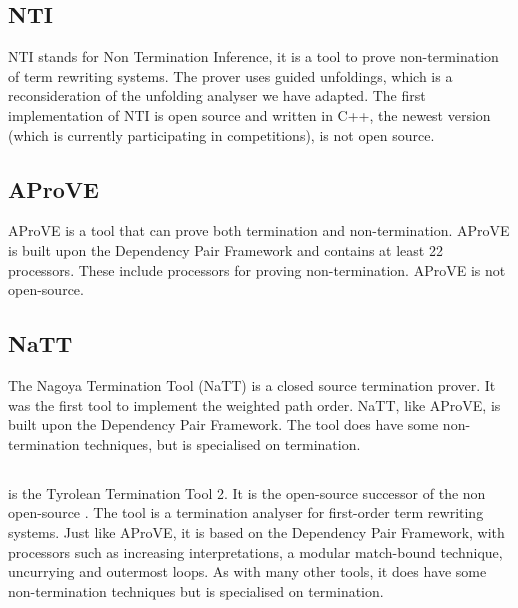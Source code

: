 \subsection*{NTI}
NTI\cite{payet2018guided} stands for Non Termination Inference, it is a tool to prove non-termination of term rewriting systems. The prover uses guided unfoldings, which is a reconsideration of the unfolding analyser we have adapted\cite{Payet:Unfolding}. The first implementation of NTI is open source and written in C++, the newest version (which is currently participating in competitions), is not open source\cite{PAYET:NTI}.

\subsection*{AProVE}
AProVE\cite{10.1007/11814771_24} is a tool that can prove both termination and non-termination. AProVE is built upon the Dependency Pair Framework and contains at least 22 processors. These include processors for proving non-termination\cite{GIESL:APROVE}. AProVE is not open-source. 

\subsection*{NaTT}
The Nagoya Termination Tool (NaTT) is a closed source termination prover\cite{Yamada2014NagoyaTT}. It was the first tool to implement the weighted path order\cite{Yamada2014NagoyaTT}. NaTT, like AProVE, is built upon the Dependency Pair Framework. The tool does have some non-termination techniques, but is specialised on termination.

\subsection*{\TTTT}
\TTTT is the Tyrolean Termination Tool 2\cite{TTTT}. It is the open-source successor of the non open-source \TTT \cite{HIROKAWA2007474}. The tool is a termination analyser for first-order term rewriting systems. Just like AProVE, it is based on the Dependency Pair Framework, with processors such as increasing interpretations, a modular match-bound technique, uncurrying and outermost loops\cite{TTTT}. As with many other tools, it does have some non-termination techniques but is specialised on termination.

